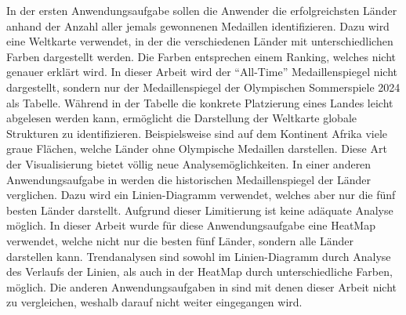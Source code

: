 In der ersten Anwendungsaufgabe sollen die Anwender die erfolgreichsten Länder anhand der Anzahl aller jemals gewonnenen Medaillen identifizieren. Dazu wird eine Weltkarte verwendet, in der die verschiedenen Länder mit unterschiedlichen Farben dargestellt werden. Die Farben entsprechen einem Ranking, welches nicht genauer erklärt wird. In dieser Arbeit wird der \enquote{All-Time} Medaillenspiegel nicht dargestellt, sondern nur der Medaillenspiegel der Olympischen Sommerspiele 2024 als Tabelle. Während in der Tabelle die konkrete Platzierung eines Landes leicht abgelesen werden kann, ermöglicht die Darstellung der Weltkarte globale Strukturen zu identifizieren. Beispielsweise sind auf dem Kontinent Afrika viele graue Flächen, welche Länder ohne Olympische Medaillen darstellen. Diese Art der Visualisierung bietet völlig neue Analysemöglichkeiten. In einer anderen Anwendungsaufgabe in \cite{relWork2} werden die historischen Medaillenspiegel der Länder verglichen. Dazu wird ein Linien-Diagramm verwendet, welches aber nur die fünf besten Länder darstellt. Aufgrund dieser Limitierung ist keine adäquate Analyse möglich. In dieser Arbeit wurde für diese Anwendungsaufgabe eine HeatMap verwendet, welche nicht nur die besten fünf Länder, sondern alle Länder darstellen kann. Trendanalysen sind sowohl im Linien-Diagramm durch Analyse des Verlaufs der Linien, als auch in der HeatMap durch unterschiedliche Farben, möglich. Die anderen Anwendungsaufgaben in \cite{relWork2} sind mit denen dieser Arbeit nicht zu vergleichen, weshalb darauf nicht weiter eingegangen wird.
